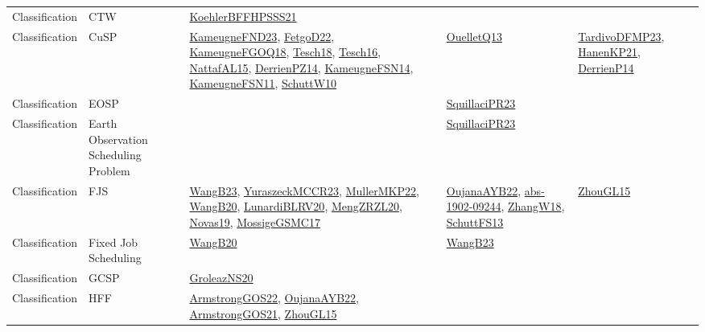 {\begin{longtable}{lp{3cm}>{\raggedright}p{6cm}>{\raggedright}p{6cm}p{8cm}}
Classification & CTW & \href{articles/KoehlerBFFHPSSS21.pdf}{KoehlerBFFHPSSS21}\cite{KoehlerBFFHPSSS21} &  & \\
Classification & CuSP & \href{papers/KameugneFND23.pdf}{KameugneFND23}\cite{KameugneFND23}, \href{articles/FetgoD22.pdf}{FetgoD22}\cite{FetgoD22}, \href{papers/KameugneFGOQ18.pdf}{KameugneFGOQ18}\cite{KameugneFGOQ18}, \href{papers/Tesch18.pdf}{Tesch18}\cite{Tesch18}, \href{papers/Tesch16.pdf}{Tesch16}\cite{Tesch16}, \href{articles/NattafAL15.pdf}{NattafAL15}\cite{NattafAL15}, \href{papers/DerrienPZ14.pdf}{DerrienPZ14}\cite{DerrienPZ14}, \href{articles/KameugneFSN14.pdf}{KameugneFSN14}\cite{KameugneFSN14}, \href{papers/KameugneFSN11.pdf}{KameugneFSN11}\cite{KameugneFSN11}, \href{papers/SchuttW10.pdf}{SchuttW10}\cite{SchuttW10} & \href{papers/OuelletQ13.pdf}{OuelletQ13}\cite{OuelletQ13} & \href{papers/TardivoDFMP23.pdf}{TardivoDFMP23}\cite{TardivoDFMP23}, \href{papers/HanenKP21.pdf}{HanenKP21}\cite{HanenKP21}, \href{papers/DerrienP14.pdf}{DerrienP14}\cite{DerrienP14}\\
Classification & EOSP &  & \href{papers/SquillaciPR23.pdf}{SquillaciPR23}\cite{SquillaciPR23} & \\
Classification & Earth Observation Scheduling Problem &  & \href{papers/SquillaciPR23.pdf}{SquillaciPR23}\cite{SquillaciPR23} & \\
Classification & FJS & \href{papers/WangB23.pdf}{WangB23}\cite{WangB23}, \href{articles/YuraszeckMCCR23.pdf}{YuraszeckMCCR23}\cite{YuraszeckMCCR23}, \href{articles/MullerMKP22.pdf}{MullerMKP22}\cite{MullerMKP22}, \href{papers/WangB20.pdf}{WangB20}\cite{WangB20}, \href{articles/LunardiBLRV20.pdf}{LunardiBLRV20}\cite{LunardiBLRV20}, \href{articles/MengZRZL20.pdf}{MengZRZL20}\cite{MengZRZL20}, \href{articles/Novas19.pdf}{Novas19}\cite{Novas19}, \href{papers/MossigeGSMC17.pdf}{MossigeGSMC17}\cite{MossigeGSMC17} & \href{papers/OujanaAYB22.pdf}{OujanaAYB22}\cite{OujanaAYB22}, \href{articles/abs-1902-09244.pdf}{abs-1902-09244}\cite{abs-1902-09244}, \href{articles/ZhangW18.pdf}{ZhangW18}\cite{ZhangW18}, \href{papers/SchuttFS13.pdf}{SchuttFS13}\cite{SchuttFS13} & \href{papers/ZhouGL15.pdf}{ZhouGL15}\cite{ZhouGL15}\\
Classification & Fixed Job Scheduling & \href{papers/WangB20.pdf}{WangB20}\cite{WangB20} & \href{papers/WangB23.pdf}{WangB23}\cite{WangB23} & \\
Classification & GCSP & \href{papers/GroleazNS20.pdf}{GroleazNS20}\cite{GroleazNS20} &  & \\
Classification & HFF & \href{papers/ArmstrongGOS22.pdf}{ArmstrongGOS22}\cite{ArmstrongGOS22}, \href{papers/OujanaAYB22.pdf}{OujanaAYB22}\cite{OujanaAYB22}, \href{papers/ArmstrongGOS21.pdf}{ArmstrongGOS21}\cite{ArmstrongGOS21}, \href{papers/ZhouGL15.pdf}{ZhouGL15}\cite{ZhouGL15} &  & \\

\end{longtable}}
